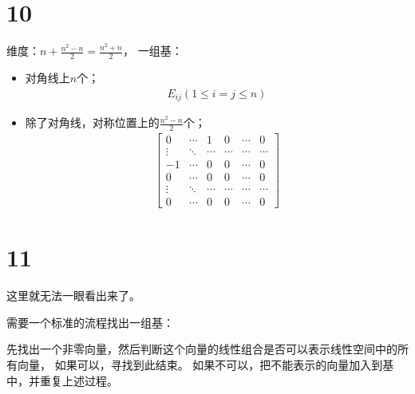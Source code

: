 \documentclass{article}
\begin{document}
\section*{10}

维度：$n + \frac{n^2 - n}{2} = \frac{n^2 + n}{2}$，
一组基：
\begin{itemize}
  \item 对角线上$n$个；
        \begin{align*}
          E_{ij} (1 \leq i=j \leq n)
        \end{align*}

  \item 除了对角线，对称位置上的$\frac{n^2 - n}{2}$个；
        \begin{align*}
          \begin{bmatrix}
            0      & \cdots & 1      & 0      & \cdots & 0      \\
            \vdots & \ddots & \cdots & \cdots & \cdots & \cdots \\
            -1     & \cdots & 0      & 0      & \cdots & 0      \\
            0      & \cdots & 0      & 0      & \cdots & 0      \\
            \vdots & \ddots & \cdots & \cdots & \cdots & \cdots \\
            0      & \cdots & 0      & 0      & \cdots & 0
          \end{bmatrix}
        \end{align*}
\end{itemize}

\section*{11}

这里就无法一眼看出来了。

需要一个标准的流程找出一组基：

先找出一个非零向量，然后判断这个向量的线性组合是否可以表示线性空间中的所有向量，
如果可以，寻找到此结束。
如果不可以，把不能表示的向量加入到基中，并重复上述过程。
\end{document}
